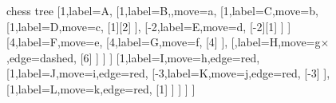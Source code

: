 {	\begin{figure}[t]
		\centering
		\caption{}
		\label{fig: tree4}
		
		\begin{forest}chess tree
			[1,label=A,
			[1,label=B,,move=a,
			[{1},label={C},move=b,
			[1,label=D,move=c,
			[1][2]
			],
			[-2,label=E,move=d,
			[-2][1]
			]
			]
			[4,label=F,move=e,
			[4,label=G,move=f,
			[4]
			],
			[,label=H,move={g$\times$},edge=dashed,
			[6]
			]
			]
			]
			[1,label=I,move=h,edge=red,
			[1,label=J,move=i,edge=red,
			[-3,label=K,move=j,edge=red,
			[-3]
			],
			[1,label=L,move=k,edge=red,
			[1]
			]
			]	
			]
			]
		\end{forest}
	\end{figure}
}
